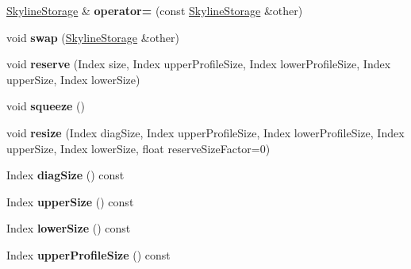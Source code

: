 \begin{DoxyCompactItemize}
\hyperlink{class_eigen_1_1_skyline_storage}{Skyline\+Storage} \& {\bfseries operator=} (const \hyperlink{class_eigen_1_1_skyline_storage}{Skyline\+Storage} \&other)
\item 
\mbox{\label{class_eigen_1_1_skyline_storage_a36cb5d6dee2f6e9ee3929799840be1c5}} 
void {\bfseries swap} (\hyperlink{class_eigen_1_1_skyline_storage}{Skyline\+Storage} \&other)
\item 
\mbox{\label{class_eigen_1_1_skyline_storage_a4b124e460d00bb59e892bf14f2b466a6}} 
void {\bfseries reserve} (Index size, Index upper\+Profile\+Size, Index lower\+Profile\+Size, Index upper\+Size, Index lower\+Size)
\item 
\mbox{\label{class_eigen_1_1_skyline_storage_a6be0d1708b4048b5bfef64c296b12f59}} 
void {\bfseries squeeze} ()
\item 
\mbox{\label{class_eigen_1_1_skyline_storage_a4735650ecee3ca2348d4225315260576}} 
void {\bfseries resize} (Index diag\+Size, Index upper\+Profile\+Size, Index lower\+Profile\+Size, Index upper\+Size, Index lower\+Size, float reserve\+Size\+Factor=0)
\item 
\mbox{\label{class_eigen_1_1_skyline_storage_ada9ba5ea1f995baa78919b5539e9a053}} 
Index {\bfseries diag\+Size} () const
\item 
\mbox{\label{class_eigen_1_1_skyline_storage_a4e04b8e3bda251623773b5ef46cd450a}} 
Index {\bfseries upper\+Size} () const
\item 
\mbox{\label{class_eigen_1_1_skyline_storage_aaecc67214f7bf0d4aa91b37d58465390}} 
Index {\bfseries lower\+Size} () const
\item 
\mbox{\label{class_eigen_1_1_skyline_storage_aefe237af538d4524a94e07db8fc4c2b2}} 
Index {\bfseries upper\+Profile\+Size} () const
\item 
\mbox{\label{class_eigen_1_1_skyline_storage_ad74e038e80620800e021ca8661a4e17a}} 

\end{DoxyCompactItemize}

